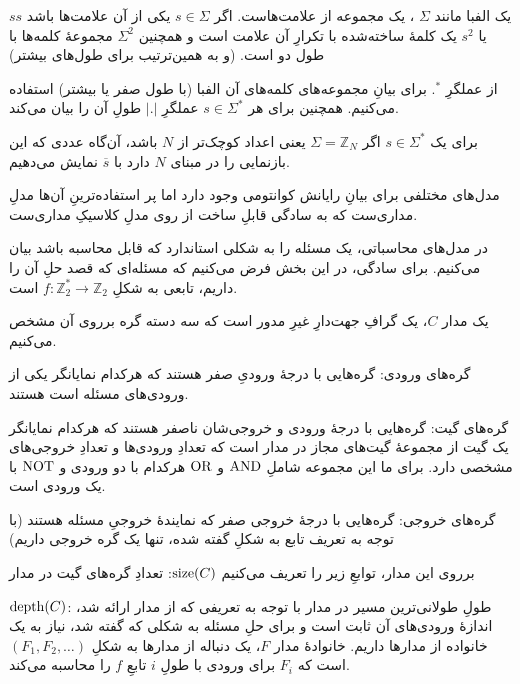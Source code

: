

یک الفبا مانند 
\(\Sigma\)
، یک مجموعه از علامت‌هاست.
اگر 
\(s \in \Sigma\)
یکی از آن علامت‌ها باشد
\(s s\)
یا
\(s^2\)
یک کلمهٔ ساخته‌شده با تکرارِ آن علامت است و همچنین 
\(\Sigma^2\)
 مجموعهٔ کلمه‌ها با طول دو است. (و به همین‌ترتیب برای طول‌های بیشتر)

از عملگرِ 
\(.^*\)
برای بیانِ مجموعه‌های کلمه‌های آن الفبا (با طول صفر یا بیشتر) استفاده می‌کنیم. همچنین برای هر 
\(s \in \Sigma^*\)
عملگرِ \(|.|\) طولِ آن را بیان می‌کند.

برای یک 
\(s \in \Sigma^*\)
اگر 
\(\Sigma = \mathbb{Z}_N\)
یعنی اعداد کوچک‌تر از \(N\) باشد، آن‌گاه عددی که این بازنمایی را در مبنای \(N\) دارد با
\(\overline{s}\)
نمایش می‌دهیم.

مدل‌های مختلفی برای بیانِ رایانش کوانتومی وجود دارد اما پر استفاده‌ترینِ آن‌ها مدلِ مداری‌ست که به سادگی قابلِ ساخت از روی مدلِ کلاسیکِ مداری‌ست.

در مدل‌های محاسباتی، یک مسئله را به شکلی استاندارد که قابل محاسبه باشد بیان می‌کنیم. برای سادگی، در این بخش فرض می‌کنیم که مسئله‌ای که قصد حلِ آن را داریم، تابعی به شکلِ
\(f: \mathbb{Z}_2^* \to \mathbb{Z}_2\)
است.

 
یک مدار \(C\)، یک گرافِ جهت‌دارِ غیرِ مدور است که سه دسته گره برروی آن مشخص می‌کنیم.

 گره‌های ورودی: گره‌هایی با درجهٔ ورودیِ صفر هستند که هرکدام نمایانگر یکی از ورودی‌های مسئله است
هستند.

 گره‌های گیت: گره‌هایی با درجهٔ ورودی و خروجی‌شان ناصفر هستند که هرکدام نمایانگر یک گیت از مجموعهٔ گیت‌های مجاز در مدار است که تعدادِ ورودی‌ها و تعدادِ خروجی‌های مشخصی دارد. برای ما این مجموعه شاملِ 
\(\operatorname{AND}\)
و 
\(\operatorname{OR}\)
هرکدام با دو ورودی و 
\(\operatorname{NOT}\)
 با یک ورودی است.

 گره‌های خروجی: گره‌هایی با درجهٔ خروجی صفر که نمایندهٔ خروجیِ مسئله هستند (با توجه به تعریف تابع به شکلِ گفته شده، تنها یک گره خروجی داریم)


برروی این مدار، توابعِ زیر را تعریف می‌کنیم
\(\operatorname{size}(C)\):
تعدادِ گره‌های گیت در مدار

\(\operatorname{depth}(C)\):
طولِ طولانی‌ترین مسیر در مدار
با توجه به تعریفی که از مدار ارائه شد، اندازهٔ ورودی‌های آن ثابت است و برای حلِ مسئله به شکلی که گفته شد، نیاز به یک خانواده از مدارها داریم. خانوادهٔ مدار \(F\)، یک دنباله از مدارها به شکلِ
\((F_1, F_2, \dots)\)
است که \(F_i\) برای ورودی با طولِ \(i\) تابعِ \(f\) را محاسبه می‌کند.



